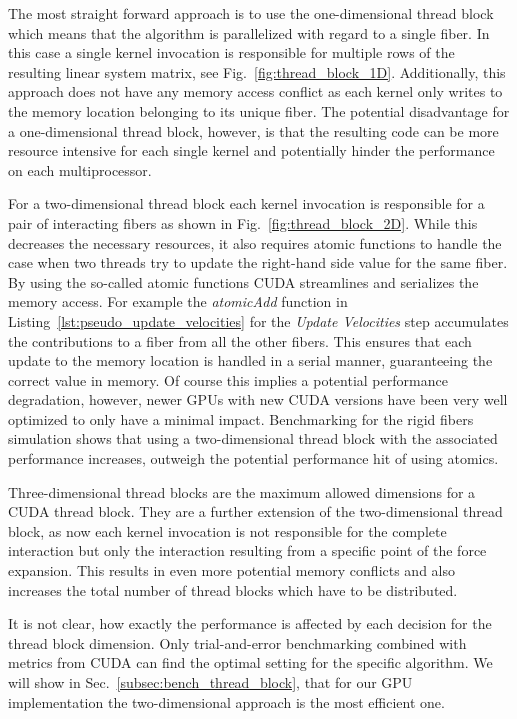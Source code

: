 The most straight forward approach is to use the one-dimensional thread block which means that the algorithm is parallelized with regard to a single fiber. In this case a single kernel invocation is responsible for multiple rows of the resulting linear system matrix, see Fig.~\ref{fig:thread_block_1D}. Additionally, this approach does not have any memory access conflict as each kernel only writes to the memory location belonging to its unique fiber. The potential disadvantage for a one-dimensional thread block, however, is that the resulting code can be more resource intensive for each single kernel and potentially hinder the performance on each multiprocessor.

For a two-dimensional thread block each kernel invocation is responsible for a pair of interacting fibers as shown in Fig.~\ref{fig:thread_block_2D}. While this decreases the necessary resources, it also requires atomic functions to handle the case when two threads try to update the right-hand side value for the same fiber. By using the so-called atomic functions CUDA streamlines and serializes the memory access. For example the \emph{atomicAdd} function in Listing~\ref{lst:pseudo_update_velocities} for the \emph{Update Velocities} step accumulates the contributions to a fiber from all the other fibers. This ensures that each update to the memory location is handled in a serial manner, guaranteeing the correct value in memory. Of course this implies a potential performance degradation, however, newer GPUs with new CUDA versions have been very well optimized to only have a minimal impact. Benchmarking for the rigid fibers simulation shows that using a two-dimensional thread block with the associated performance increases, outweigh the potential performance hit of using atomics.

Three-dimensional thread blocks are the maximum allowed dimensions for a CUDA thread block. They are a further extension of the two-dimensional thread block, as now each kernel invocation is not responsible for the complete interaction but only the interaction resulting from a specific point of the force expansion. This results in even more potential memory conflicts and also increases the total number of thread blocks which have to be distributed.

It is not clear, how exactly the performance is affected by each decision for the thread block dimension. Only trial-and-error benchmarking combined with metrics from CUDA can find the optimal setting for the specific algorithm. We will show in Sec.~\ref{subsec:bench_thread_block}, that for our GPU implementation the two-dimensional approach is the most efficient one.

